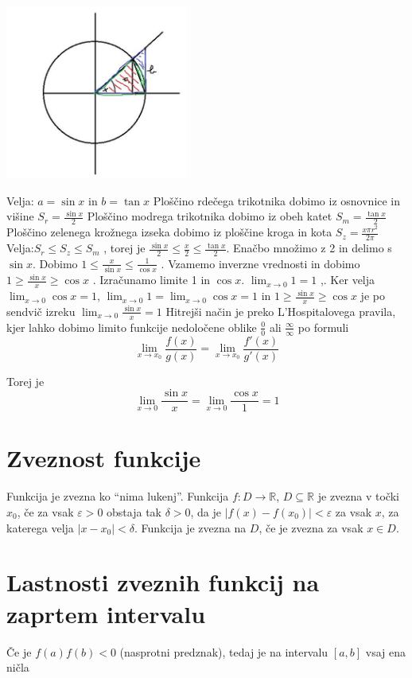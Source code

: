 \documentclass[12pt]{report}
\newcommand{\R}{\mathbb{R}}
\begin{document}
  \begin{slika}[H]
  \centering
  \includegraphics[width = 6cm]{37}
\end{slika} 
 
Velja: $a=\sin x$ in $b=\tan x$
Ploščino rdečega trikotnika dobimo iz osnovnice in višine $S_r=\frac{\sin x}{2}$
Ploščino modrega trikotnika dobimo iz obeh katet  $S_m=\frac{\tan x}{2}$
\bigbreak
Ploščino zelenega krožnega izseka dobimo iz ploščine kroga in kota $S_z=\frac{x\pi r^2}{2\pi}$
Velja:$S_r \leq S_z \leq S_m$ , torej je $\frac{\sin x}{2} \leq \frac{x}{2} \leq \frac{\tan x}{2}$. Enačbo množimo z 2 in delimo s $\sin x$. Dobimo $1 \leq \frac{x}{\sin x}\leq \frac{1}{\cos x}$ . Vzamemo inverzne vrednosti in dobimo $1 \geq \frac{\sin x}{x}\geq \cos x$ . Izračunamo limite 1 in $\cos x$. $\displaystyle \lim_{x \to 0}1=1$ ,. Ker velja $\displaystyle \lim_{x \to 0}\cos x=1$, $\displaystyle \lim_{x \to 0}1= \lim_{x \to 0}\cos x=1$  in $1 \geq \frac{\sin x}{x} \geq \cos x$ je po sendvič izreku  $\displaystyle\lim_{x \to 0}\frac{\sin x}{x}=1$
\bigbreak
Hitrejši način je preko L’Hospitalovega pravila, kjer lahko dobimo limito funkcije nedoločene oblike $\frac{0}{0}$ ali $\frac{\infty}{\infty}$ po formuli  \[\lim_{x \to x_0}\frac{f(x)}{g(x)}= \lim_{x \to x_0}\frac{f'(x)}{g'(x)}\]  

Torej je \[\lim_{x \to 0}\frac{\sin x}{x}= \lim_{x \to 0}\frac{\cos x}{1} = 1 \]

\section*{Zveznost funkcije}
Funkcija je zvezna ko “nima lukenj”.
Funkcija $f:D \to \R$, $D \subseteq \R$ je zvezna v točki $x_0$, če za vsak $\varepsilon>0$ obstaja tak $\delta>0$, da je $|f(x)-f(x_0)|<\varepsilon$ za vsak $x$, za katerega velja $|x-x_0|<\delta$. Funkcija je zvezna na $D$, če je zvezna za vsak $x\in D$.

\section*{Lastnosti zveznih funkcij na zaprtem intervalu}
Če je $f(a)f(b)<0$ (nasprotni predznak), tedaj je na intervalu $[a, b]$ vsaj ena ničla
\end{document}
